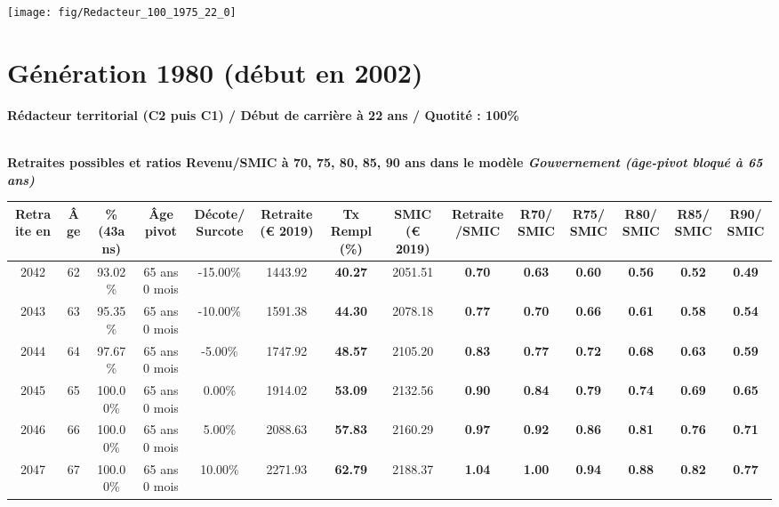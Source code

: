  {\hspace{-2.2cm}\texttt{[image: fig/Redacteur\_100\_1975\_22\_0]}} 

\newpage 
 
\section{Génération 1980 (début en 2002)\label{Redacteur_100_1980_22_0}} 
 
{\bf \noindent Rédacteur territorial (C2 puis C1) / Début de carrière à 22 ans / Quotité : 100\%}  ~ 

 ~\\{\bf \noindent Retraites possibles et ratios Revenu/SMIC à 70, 75, 80, 85, 90 ans dans le modèle \emph{Gouvernement (âge-pivot bloqué à 65 ans)}}  
 
\begin{adjustbox}{max width=\textwidth} 
\begin{tabular}[htb]{|c|c||c|c|c||c|c||c|c||c|c|c|c|c|} 
\hline 
 Retraite en &  Âge &  \%(43ans) &  Âge pivot &  Décote/Surcote &  Retraite (\euro{} 2019) &  Tx Rempl(\%) &  SMIC (\euro{} 2019) &  Retraite/SMIC &  R70/SMIC &  R75/SMIC &  R80/SMIC &  R85/SMIC &  R90/SMIC \\ 
\hline \hline 
 2042 &  62 &  93.02\% &  65 ans 0 mois &  -15.00\% &  1443.92 &  {\bf 40.27} &  2051.51 &  {\bf {\color{red} 0.70}} &  {\bf {\color{red} 0.63}} &  {\bf {\color{red} 0.60}} &  {\bf {\color{red} 0.56}} &  {\bf {\color{red} 0.52}} &  {\bf {\color{red} 0.49}} \\ 
\hline 
 2043 &  63 &  95.35\% &  65 ans 0 mois &  -10.00\% &  1591.38 &  {\bf 44.30} &  2078.18 &  {\bf {\color{red} 0.77}} &  {\bf {\color{red} 0.70}} &  {\bf {\color{red} 0.66}} &  {\bf {\color{red} 0.61}} &  {\bf {\color{red} 0.58}} &  {\bf {\color{red} 0.54}} \\ 
\hline 
 2044 &  64 &  97.67\% &  65 ans 0 mois &  -5.00\% &  1747.92 &  {\bf 48.57} &  2105.20 &  {\bf {\color{red} 0.83}} &  {\bf {\color{red} 0.77}} &  {\bf {\color{red} 0.72}} &  {\bf {\color{red} 0.68}} &  {\bf {\color{red} 0.63}} &  {\bf {\color{red} 0.59}} \\ 
\hline 
 2045 &  65 &  100.00\% &  65 ans 0 mois &  0.00\% &  1914.02 &  {\bf 53.09} &  2132.56 &  {\bf {\color{red} 0.90}} &  {\bf {\color{red} 0.84}} &  {\bf {\color{red} 0.79}} &  {\bf {\color{red} 0.74}} &  {\bf {\color{red} 0.69}} &  {\bf {\color{red} 0.65}} \\ 
\hline 
 2046 &  66 &  100.00\% &  65 ans 0 mois &  5.00\% &  2088.63 &  {\bf 57.83} &  2160.29 &  {\bf {\color{red} 0.97}} &  {\bf {\color{red} 0.92}} &  {\bf {\color{red} 0.86}} &  {\bf {\color{red} 0.81}} &  {\bf {\color{red} 0.76}} &  {\bf {\color{red} 0.71}} \\ 
\hline 
 2047 &  67 &  100.00\% &  65 ans 0 mois &  10.00\% &  2271.93 &  {\bf 62.79} &  2188.37 &  {\bf 1.04} &  {\bf {\color{red} 1.00}} &  {\bf {\color{red} 0.94}} &  {\bf {\color{red} 0.88}} &  {\bf {\color{red} 0.82}} &  {\bf {\color{red} 0.77}} \\ 
\hline 
\hline 
\end{tabular} 
\end{adjustbox} 
 
